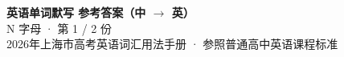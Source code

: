 \documentclass[10pt,a4paper]{article}
\begin{document}
\pagestyle{plain}

\begin{center}
{\LARGE\bfseries 英语单词默写 \quad 参考答案（中 $\to$ 英）}\\[0.22em]
{\large N 字母 · 第 1 / 2 份}\\[0.18em]
{\small 2026年上海市高考英语词汇用法手册 · 参照普通高中英语课程标准}
\end{center}

\vspace{0.2em}
\noindent{\color{rulegray}\rule{\textwidth}{0.8pt}}

\vspace{0.35em}

\vspace{0.25em}
\renewcommand{\arraystretch}{1.32}
\end{document}
